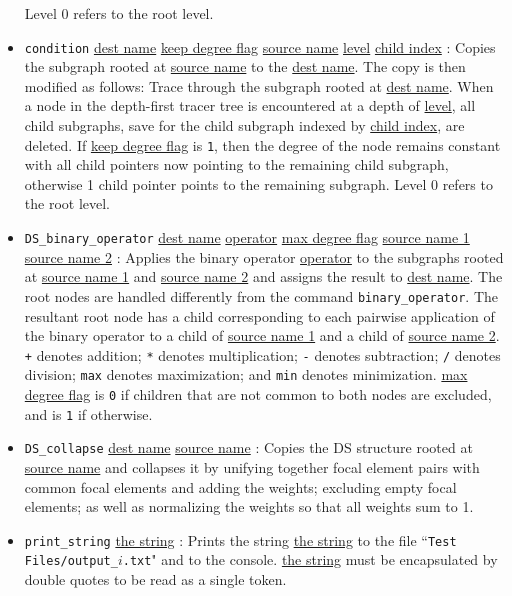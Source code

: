 \documentclass{article}
\begin{document}
\begin{itemize}
Level 0 refers to the root level.
%
\item \texttt{condition} \underline{dest name} \underline{keep degree flag} \underline{source name} \underline{level} \underline{child index} : Copies the subgraph rooted at \underline{source name} to the \underline{dest name}. The copy is then modified as follows: Trace through the subgraph rooted at \underline{dest name}. When a node in the depth-first tracer tree is encountered at a depth of \underline{level}, all child subgraphs, save for the child subgraph indexed by \underline{child index}, are deleted. If \underline{keep degree flag} is \texttt{1}, then the degree of the node remains constant with all child pointers now pointing to the remaining child subgraph, otherwise 1 child pointer points to the remaining subgraph. 
Level 0 refers to the root level. 
%
\item \texttt{DS\_binary\_operator} \underline{dest name} \underline{operator} \underline{max degree flag} \underline{source name 1} \underline{source name 2} : Applies the binary operator \underline{operator} to the subgraphs rooted at \underline{source name 1} and \underline{source name 2} and assigns the result to \underline{dest name}. The root nodes are handled differently from the command \texttt{binary\_operator}. The resultant root node has a child corresponding to each pairwise application of the binary operator to a child of \underline{source name 1} and a child of \underline{source name 2}.
\texttt{+} denotes addition; \texttt{*} denotes multiplication; \texttt{-} denotes subtraction; \texttt{/} denotes division; \texttt{max} denotes maximization; and \texttt{min} denotes minimization.
\underline{max degree flag} is \texttt{0} if children that are not common to both nodes are excluded, and is \texttt{1} if otherwise.  
%
\item \texttt{DS\_collapse} \underline{dest name} \underline{source name} : Copies the DS structure rooted at \underline{source name} and collapses it by unifying together focal element pairs with common focal elements and adding the weights; excluding empty focal elements; as well as normalizing the weights so that all weights sum to 1. %
%
\item \texttt{print\_string} \underline{the string} : Prints the string \underline{the string} to the file ``\texttt{Test Files/output\_\(i\).txt}" and to the console. \underline{the string} must be encapsulated by double quotes to be read as a single token.

\end{itemize}
\end{document}
